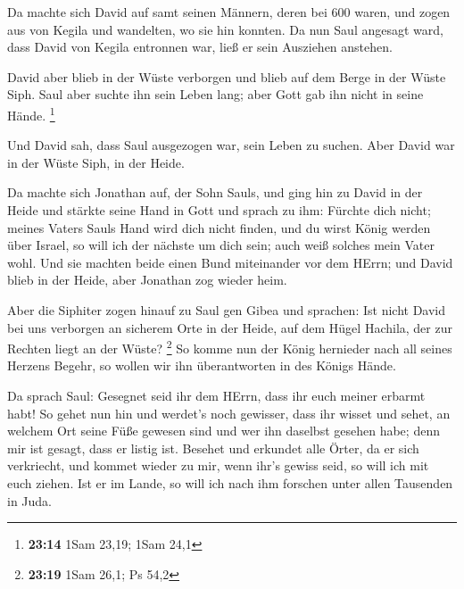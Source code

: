  Da machte sich David auf samt seinen Männern, deren bei
600 waren, und zogen aus von Kegila und wandelten, wo sie hin konnten.
Da nun Saul angesagt ward, dass David von Kegila entronnen war, ließ er
sein Ausziehen anstehen.

 David aber blieb in der Wüste verborgen und blieb auf dem
Berge in der Wüste Siph. Saul aber suchte ihn sein Leben lang; aber Gott
gab ihn nicht in seine Hände. \footnote{\textbf{23:14} 1Sam 23,19; 1Sam
  24,1}

 Und David sah, dass Saul ausgezogen war, sein Leben zu
suchen. Aber David war in der Wüste Siph, in der Heide.

 Da machte sich Jonathan auf, der Sohn Sauls, und ging hin
zu David in der Heide und stärkte seine Hand in Gott  und
sprach zu ihm: Fürchte dich nicht; meines Vaters Sauls Hand wird dich
nicht finden, und du wirst König werden über Israel, so will ich der
nächste um dich sein; auch weiß solches mein Vater wohl. 
Und sie machten beide einen Bund miteinander vor dem HErrn; und David
blieb in der Heide, aber Jonathan zog wieder heim.

 Aber die Siphiter zogen hinauf zu Saul gen Gibea und
sprachen: Ist nicht David bei uns verborgen an sicherem Orte in der
Heide, auf dem Hügel Hachila, der zur Rechten liegt an der Wüste?
\footnote{\textbf{23:19} 1Sam 26,1; Ps 54,2}  So komme nun
der König hernieder nach all seines Herzens Begehr, so wollen wir ihn
überantworten in des Königs Hände.

 Da sprach Saul: Gesegnet seid ihr dem HErrn, dass ihr euch
meiner erbarmt habt!  So gehet nun hin und werdet's noch
gewisser, dass ihr wisset und sehet, an welchem Ort seine Füße gewesen
sind und wer ihn daselbst gesehen habe; denn mir ist gesagt, dass er
listig ist.  Besehet und erkundet alle Örter, da er sich
verkriecht, und kommet wieder zu mir, wenn ihr's gewiss seid, so will
ich mit euch ziehen. Ist er im Lande, so will ich nach ihm forschen
unter allen Tausenden in Juda.

